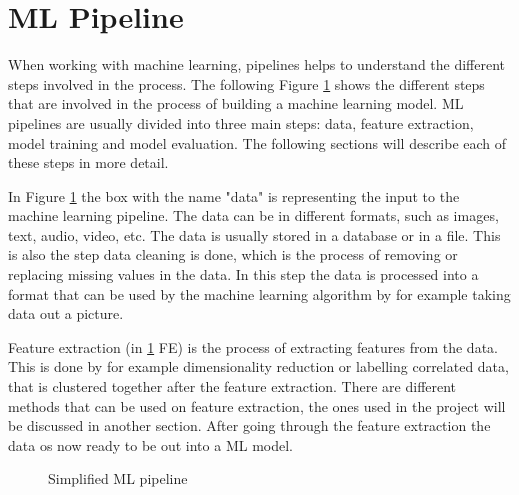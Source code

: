 \section{ML Pipeline}\label{sec:ml-pipeline}
When working with machine learning, pipelines helps to understand the different steps involved in the process. The following Figure \ref{fig:ml-pipeline} shows the different steps that are involved in the process of building a machine learning model.
ML pipelines are usually divided into three main steps: data, feature extraction, model training and model evaluation. The following sections will describe each of these steps in more detail.

In Figure \ref{fig:ml-pipeline} the box with the name "data" is representing the input to the machine learning pipeline. The data can be in different formats, such as images, text, audio, video, etc. The data is usually stored in a database or in a file. This is also the step data cleaning is done, which is the process of removing or replacing missing values in the data. In this step the data is processed into a format that can be used by the machine learning algorithm by for example taking data out a picture.

Feature extraction (in \ref{fig:ml-pipeline} FE) is the process of extracting features from the data. This is done by for example dimensionality reduction or labelling correlated data, that is clustered together after the feature extraction. There are different methods that can be used on feature extraction, the ones used in the project will be discussed in another section. After going through the feature extraction the data os now ready to be out into a ML  model.


\begin{figure}
  \centering
  \caption{Simplified ML pipeline}
  \label{fig:ml-pipeline}
\end{figure}


